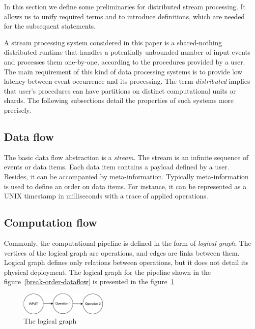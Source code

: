 
\label {fs-stream}

In this section we define some preliminaries for distributed stream processing. It allows us to unify required terms and to introduce definitions, which are needed for the subsequent statements.

A  stream processing system considered in this paper  is a shared-nothing distributed runtime that handles a potentially unbounded number of input events and processes them one-by-one, according to the procedures provided by a user. The main requirement  of this kind of data processing systems is to provide low latency between event occurrence and its processing. The term {\em distributed} implies that user's procedures can have partitions on distinct computational units or shards. The following subsections detail the properties of such systems more precisely.  

\subsection{Data flow}
The basic data flow abstraction is a {\it stream}. The stream is an infinite sequence of events or data items. Each data item contains a payload defined by a user. Besides, it can be accompanied  by meta-information. Typically  meta-information is used to define an order on data items. For instance, it can be represented as a UNIX timestamp in milliseconds with a trace of applied operations.

\subsection{Computation flow}
Commonly, the computational pipeline is defined in the form of {\it logical graph}. The vertices of the logical graph are operations, and edges are links between them. Logical graph defines only relations between operations, but it does not detail its physical deployment. The logical graph for the pipeline shown in the figure~\ref{break-order-dataflow} is presented in the figure~\ref{break-order-dataflow-logical}

\begin{figure}[htbp]
  \centering
  \includegraphics[width=0.38\textwidth]{pics/break_order_pipeline_logical}
  \caption{The logical graph}
  \label {break-order-dataflow-logical}
\end{figure}

